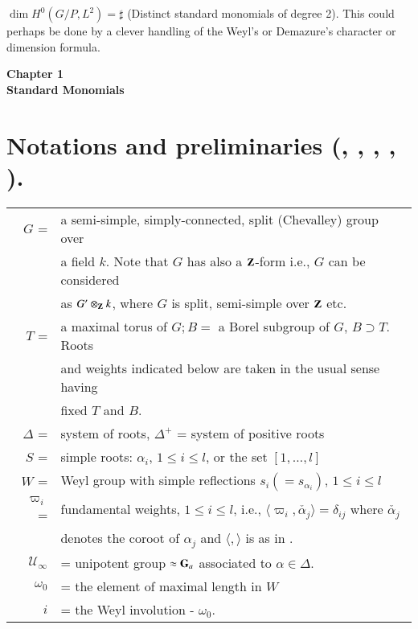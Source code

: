 $\dim H^0 (G/P, L^2) = \sharp$ (Distinct standard monomials of degree 2). This could perhaps be done by a clever handling of the Weyl's or Demazure's character or dimension formula.

\vskip 0.8cm

\begin{center}
{\bf Chapter 1}\\[0.2cm]
{\bf \large Standard Monomials}
\end{center}\pageoriginale

\section{Notations and preliminaries (\cf \texorpdfstring{\cite{art18-key1}, \cite{art18-key2}, \cite{art18-key3}, \cite{art18-key5}, \cite{art18-key12}}{Cite}).}\label{art18-sec1}

\begin{tabular}{r@{\;}l}
$G$  = & a semi-simple, simply-connected, split (Chevalley) group over\\
& a field $k$. Note that $G$ has also a $\mathbf{Z}$-form i.e., $G$ can be  considered\\
&  as $G' \otimes_{\mathbf{Z}} k$, where $G$ is split, semi-simple over $\mathbf{Z}$ etc.\\
$T$ = & a maximal torus of $G;B =$ a Borel subgroup of $G$, $B \supset T$.
Roots\\
& and weights indicated below are taken in the usual sense having\\
& fixed $T$ and $B$.\\
$\Delta$ = & system of roots, $\Delta^+$ = system of positive roots\\
$S$ = & simple roots: $\alpha_i$, $1 \leqslant i \leqslant l$, or the set $[1, \ldots, l]$ \\
$W$ = & Weyl group with simple reflections $s_i (=s_{\alpha_i})$, $1 \leqslant i \leqslant l$\\
 $\varpi_i$ = & fundamental weights, $1 \leqslant i \leqslant l$, i.e., $\langle \varpi_i, \check{\alpha_j}   \rangle  = \delta_{ij}$ where $\check{\alpha_j}$\\
&  denotes the coroot of $\alpha_j$ and $\langle , \rangle$ is as in \cite{art18-key4}.\\
$\mathscr{U}_\infty$ & = unipotent group $\approx \mathbf{G}_a$ associated to $\alpha \in\Delta$.\\
$\omega_0$ & = the element of maximal length in $W$\\
$i$ & = the Weyl involution - $\omega_0$.
\end{tabular}

